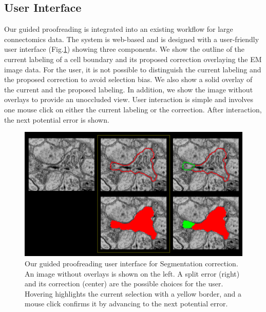 \subsection{User Interface}

Our guided proofreading is integrated into an existing workflow for large connectomics data. The system is web-based and is designed with a user-friendly user interface (Fig.\ref{fig:ui}) showing three components. We show the outline of the current labeling of a cell boundary and its proposed correction overlaying the EM image data. For the user, it is not possible to distinguish the current labeling and the proposed correction to avoid selection bias. We also show a solid overlay of the current and the proposed labeling. In addition, we show the image without overlays to provide an unoccluded view. User interaction is simple and involves one mouse click on either the current labeling or the correction. After interaction, the next potential error is shown.

\begin{figure}[h]
\begin{center}
  \includegraphics[width=\linewidth]{gfx/user_interface_split.pdf}
\end{center}
  \vspace{-4mm}
   \caption{Our guided proofreading user interface for Segmentation correction. An image without overlays is shown on the left. A split error (right) and its correction (center) are the possible choices for the user. Hovering highlights the current selection with a yellow border, and a mouse click confirms it by advancing to the next potential error.}
\label{fig:ui}
\end{figure}

